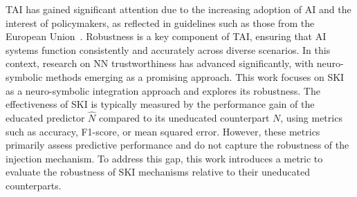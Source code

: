 %
\Gls{TAI} has gained significant attention due to the increasing adoption of \gls{AI} and the interest of policymakers, as reflected in guidelines such as those from the European Union~\cite{eu_ethics_guidelines_ai}.
%
Robustness is a key component of \gls{TAI}, ensuring that \gls{AI} systems function consistently and accurately across diverse scenarios.
%
In this context, research on \gls{NN} trustworthiness has advanced significantly, with neuro-symbolic methods emerging as a promising approach.
%
This work focuses on \gls{SKI} as a neuro-symbolic integration approach and explores its robustness.
%
The effectiveness of \gls{SKI} is typically measured by the performance gain of the educated predictor \(\hat{N}\) compared to its uneducated counterpart \(N\), using metrics such as accuracy, F1-score, or mean squared error.
%
However, these metrics primarily assess predictive performance and do not capture the robustness of the injection mechanism.
%
To address this gap, this work introduces a metric to evaluate the robustness of \gls{SKI} mechanisms relative to their uneducated counterparts.


